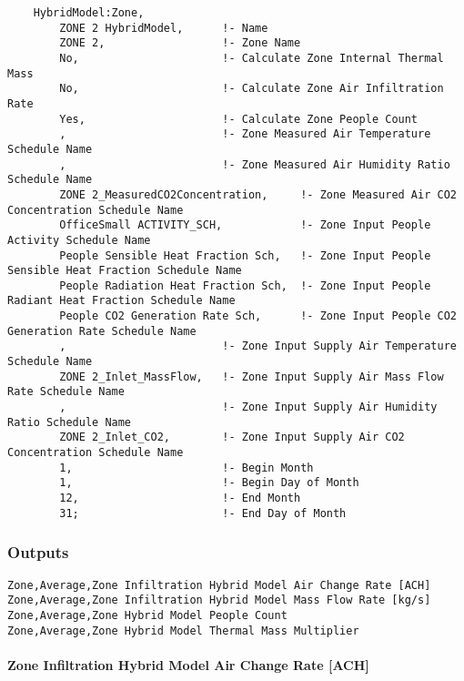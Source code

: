 \begin{lstlisting}
    HybridModel:Zone,
        ZONE 2 HybridModel,      !- Name
        ZONE 2,                  !- Zone Name
        No,                      !- Calculate Zone Internal Thermal Mass
        No,                      !- Calculate Zone Air Infiltration Rate
        Yes,                     !- Calculate Zone People Count
        ,                        !- Zone Measured Air Temperature Schedule Name
        ,                        !- Zone Measured Air Humidity Ratio Schedule Name
        ZONE 2_MeasuredCO2Concentration,     !- Zone Measured Air CO2 Concentration Schedule Name
        OfficeSmall ACTIVITY_SCH,            !- Zone Input People Activity Schedule Name
        People Sensible Heat Fraction Sch,   !- Zone Input People Sensible Heat Fraction Schedule Name
        People Radiation Heat Fraction Sch,  !- Zone Input People Radiant Heat Fraction Schedule Name
        People CO2 Generation Rate Sch,      !- Zone Input People CO2 Generation Rate Schedule Name
        ,                        !- Zone Input Supply Air Temperature Schedule Name
        ZONE 2_Inlet_MassFlow,   !- Zone Input Supply Air Mass Flow Rate Schedule Name
        ,                        !- Zone Input Supply Air Humidity Ratio Schedule Name
        ZONE 2_Inlet_CO2,        !- Zone Input Supply Air CO2 Concentration Schedule Name
        1,                       !- Begin Month
        1,                       !- Begin Day of Month
        12,                      !- End Month
        31;                      !- End Day of Month

\end{lstlisting}


\subsubsection{Outputs}\label{outputs-030}

\begin{lstlisting}
Zone,Average,Zone Infiltration Hybrid Model Air Change Rate [ACH]
Zone,Average,Zone Infiltration Hybrid Model Mass Flow Rate [kg/s]
Zone,Average,Zone Hybrid Model People Count
Zone,Average,Zone Hybrid Model Thermal Mass Multiplier
\end{lstlisting}

\paragraph{Zone Infiltration Hybrid Model Air Change Rate {[}ACH{]}}\label{zone-infiltration-hybrid-model-air-change-rate}


